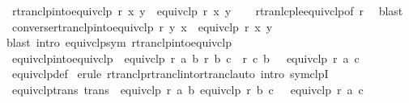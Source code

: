 \begin{isabellebody}
\endisatagproof
{\isafoldproof}%
%
\isadelimproof
\isanewline
%
\endisadelimproof
\isanewline
{}\isamarkupfalse%
\ rtranclp{\isacharunderscore}{\kern0pt}into{\isacharunderscore}{\kern0pt}equivclp{\isacharcolon}{\kern0pt}\ {\isachardoublequoteopen}r\isactrlsup {\isacharasterisk}{\kern0pt}\isactrlsup {\isacharasterisk}{\kern0pt}\ x\ y\ {\isasymLongrightarrow}\ equivclp\ r\ x\ y{\isachardoublequoteclose}\isanewline
%
\isadelimproof
\ \ %
\endisadelimproof
%
\isatagproof
{}\isamarkupfalse%
\ rtranlcp{\isacharunderscore}{\kern0pt}le{\isacharunderscore}{\kern0pt}equivclp{\isacharbrackleft}{\kern0pt}of\ r{\isacharbrackright}{\kern0pt}\ \isamarkupfalse%
\ blast%
\endisatagproof
{\isafoldproof}%
%
\isadelimproof
\isanewline
%
\endisadelimproof
\isanewline
{}\isamarkupfalse%
\ converse{\isacharunderscore}{\kern0pt}rtranclp{\isacharunderscore}{\kern0pt}into{\isacharunderscore}{\kern0pt}equivclp{\isacharcolon}{\kern0pt}\ {\isachardoublequoteopen}r\isactrlsup {\isacharasterisk}{\kern0pt}\isactrlsup {\isacharasterisk}{\kern0pt}\ y\ x\ {\isasymLongrightarrow}\ equivclp\ r\ x\ y{\isachardoublequoteclose}\isanewline
%
\isadelimproof
\ \ %
\endisadelimproof
%
\isatagproof
{}\isamarkupfalse%
{\isacharparenleft}{\kern0pt}blast\ intro{\isacharcolon}{\kern0pt}\ equivclp{\isacharunderscore}{\kern0pt}sym\ rtranclp{\isacharunderscore}{\kern0pt}into{\isacharunderscore}{\kern0pt}equivclp{\isacharparenright}{\kern0pt}%
\endisatagproof
{\isafoldproof}%
%
\isadelimproof
\isanewline
%
\endisadelimproof
\isanewline
{}\isamarkupfalse%
\ equivclp{\isacharunderscore}{\kern0pt}into{\isacharunderscore}{\kern0pt}equivclp{\isacharcolon}{\kern0pt}\ {\isachardoublequoteopen}{\isasymlbrakk}\ equivclp\ r\ a\ b{\isacharsemicolon}{\kern0pt}\ r\ b\ c\ {\isasymor}\ r\ c\ b\ {\isasymrbrakk}\ {\isasymLongrightarrow}\ equivclp\ r\ a\ c{\isachardoublequoteclose}\isanewline
%
\isadelimproof
\ \ %
\endisadelimproof
%
\isatagproof
{}\isamarkupfalse%
\ equivclp{\isacharunderscore}{\kern0pt}def\ \isamarkupfalse%
{\isacharparenleft}{\kern0pt}erule\ rtranclp{\isachardot}{\kern0pt}rtrancl{\isacharunderscore}{\kern0pt}into{\isacharunderscore}{\kern0pt}rtrancl{\isacharparenright}{\kern0pt}{\isacharparenleft}{\kern0pt}auto\ intro{\isacharcolon}{\kern0pt}\ symclpI{\isacharparenright}{\kern0pt}%
\endisatagproof
{\isafoldproof}%
%
\isadelimproof
\isanewline
%
\endisadelimproof
\isanewline
{}\isamarkupfalse%
\ equivclp{\isacharunderscore}{\kern0pt}trans\ {\isacharbrackleft}{\kern0pt}trans{\isacharbrackright}{\kern0pt}{\isacharcolon}{\kern0pt}\ {\isachardoublequoteopen}{\isasymlbrakk}\ equivclp\ r\ a\ b{\isacharsemicolon}{\kern0pt}\ equivclp\ r\ b\ c\ {\isasymrbrakk}\ {\isasymLongrightarrow}\ equivclp\ r\ a\ c{\isachardoublequoteclose}\isanewline

\end{isabellebody}
